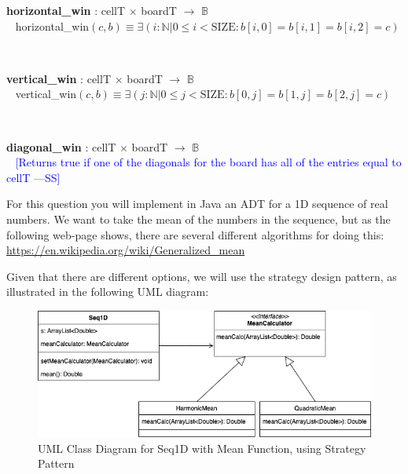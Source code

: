 \documentclass[12pt,fleqn]{examtst}
\newcommand{\authornote}[3]{\textcolor{#1}{[#3 ---#2]}}
\newcommand{\authornote}[3]{}
\newcommand{\wss}[1]{\authornote{blue}{SS}{#1}}
\begin{document}
\noindent \textbf{horizontal\_win} : cellT $\times$ boardT $\rightarrow$ $\mathbb{B}$\\
~\newline
horizontal\_win$(c, b) \equiv \exists (i : \mathbb{N} | 0 \leq i < \mbox{SIZE} : b[i, 0] = b[i, 1] = b[i, 2] = c)$

~\newline

\noindent \textbf{vertical\_win} : cellT $\times$ boardT $\rightarrow$ $\mathbb{B}$\\
~\newline
vertical\_win$(c, b) \equiv \exists (j : \mathbb{N} | 0 \leq j < \mbox{SIZE} : b[0, j] = b[1, j] = b[2, j] = c)$

~\newline

\noindent \textbf{diagonal\_win} : cellT $\times$ boardT $\rightarrow$ $\mathbb{B}$\\
~\newline
\wss{Returns true if one of the diagonals for the board has all of the entries
  equal to cellT}
~\newline



\newpage

 For this question you will implement in Java an ADT for a 1D
sequence of real numbers.  We want to take the mean of the numbers in the
sequence, but as the following web-page shows, there are several different
algorithms for doing this: \url{https://en.wikipedia.org/wiki/Generalized_mean}

Given that there are different options, we will use the strategy design pattern,
as illustrated in the following UML diagram:

\begin{figure}[!h]
\begin{center}
\includegraphics[scale=0.7]{Seq1D_Mean_Strategy_UML.png}
\end{center}
\caption{UML Class Diagram for Seq1D with Mean Function, using Strategy
  Pattern} \label{Fig_UML_Strategy}
\end{figure}
\end{document}
